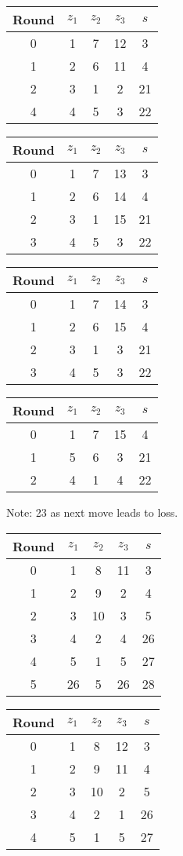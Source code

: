 \begin{tabular}{c | c | c | c | c }
Round & $z_1$ & $z_2$ & $z_3$ & $s$ \\
\hline
0 & 1 & 7 & 12 & 3 \\
1 & 2 & 6 & 11 & 4 \\
2 & 3 & 1 & 2 & 21 \\
4 & 4 & 5 & 3 & 22
\end{tabular}

\begin{tabular}{c | c | c | c | c }
Round & $z_1$ & $z_2$ & $z_3$ & $s$ \\
\hline
0 & 1 & 7 & 13 & 3 \\
1 & 2 & 6 & 14 & 4 \\
2 & 3 & 1 & 15 & 21 \\
3 & 4 & 5 & 3 & 22
\end{tabular}

\begin{tabular}{c | c | c | c | c }
Round & $z_1$ & $z_2$ & $z_3$ & $s$ \\
\hline
0 & 1 & 7 & 14 & 3 \\
1 & 2 & 6 & 15 & 4 \\
2 & 3 & 1 & 3 & 21 \\
3 & 4 & 5 & 3 & 22
\end{tabular}

\begin{tabular}{c | c | c | c | c }
Round & $z_1$ & $z_2$ & $z_3$ & $s$ \\
\hline
0 & 1 & 7 & 15 & 4 \\
1 & 5 & 6 & 3 & 21 \\
2 & 4 & 1 & 4 & 22 \\
\end{tabular}
Note: 23 as next move leads to loss.

\begin{tabular}{c | c | c | c | c }
Round & $z_1$ & $z_2$ & $z_3$ & $s$ \\
\hline
0 & 1 & 8 & 11 & 3 \\
1 & 2 & 9 & 2 & 4 \\
2 & 3 & 10 & 3 & 5 \\
3 & 4 & 2 & 4 & 26 \\
4 & 5 & 1 & 5 & 27 \\
5 & 26 & 5 & 26 & 28
\end{tabular}


\begin{tabular}{c | c | c | c | c }
Round & $z_1$ & $z_2$ & $z_3$ & $s$ \\
\hline
0 & 1 & 8 & 12 & 3 \\
1 & 2 & 9 & 11 & 4 \\
2 & 3 & 10 & 2 & 5 \\
3 & 4 & 2 & 1 & 26 \\
4 & 5 & 1 & 5 & 27
\end{tabular}


